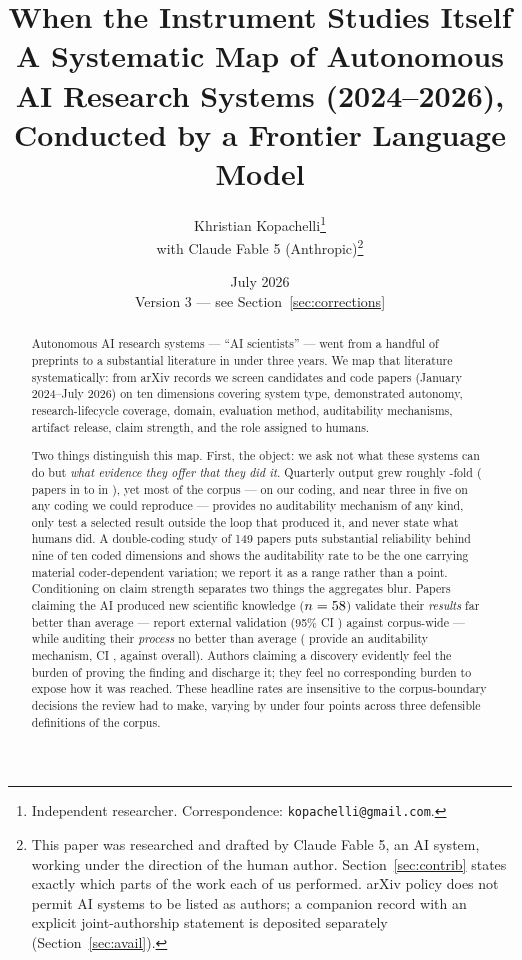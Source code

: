 \documentclass[11pt]{article}
\title{\textbf{When the Instrument Studies Itself}\\[0.3em]
\large A Systematic Map of Autonomous AI Research Systems (2024--2026),\\
Conducted by a Frontier Language Model}
\author{Khristian Kopachelli\thanks{Independent researcher. Correspondence:
\texttt{kopachelli@gmail.com}.}
\\[0.4em]
\normalsize with Claude Fable 5 (Anthropic)\thanks{This paper was researched and drafted by
Claude Fable 5, an AI system, working under the direction of the human author. Section~\ref{sec:contrib}
states exactly which parts of the work each of us performed. arXiv policy does not permit AI
systems to be listed as authors; a companion record with an explicit joint-authorship
statement is deposited separately (Section~\ref{sec:avail}).}}
\date{July 2026\\[0.2em]{\small Version 3 --- see Section~\ref{sec:corrections}}}
\begin{document}
\maketitle

\begin{abstract}
\noindent
Autonomous AI research systems --- ``AI scientists'' --- went from a handful of preprints to
a substantial literature in under three years. We map that literature systematically: from
\nHarvest{} arXiv records we screen \nScreened{} candidates and code \nCorpus{} papers
(January 2024--July 2026) on ten dimensions covering system type, demonstrated autonomy,
research-lifecycle coverage, domain, evaluation method, auditability mechanisms, artifact
release, claim strength, and the role assigned to humans.

Two things distinguish this map. First, the object: we ask not what these systems can do but
\emph{what evidence they offer that they did it}. Quarterly output grew roughly
\growthFactor{}-fold (\firstQn{} papers in \firstQ{} to \peakQn{} in \peakQ{}), yet most of
the corpus --- \pctAuditNone{} on our coding, and near three in five on any coding we could
reproduce --- provides no auditability mechanism of any kind, only \pctHeldOut{} test a
selected result outside the loop that produced it, and \pctHumanUnspec{} never state what
humans did. A double-coding study of 149 papers puts substantial reliability behind nine of
ten coded dimensions and shows the auditability rate to be the one carrying material
coder-dependent variation; we report it as a range rather than a point. Conditioning on claim strength separates two
things the aggregates blur. Papers claiming the AI produced new scientific knowledge
($n=58{}$) validate their \emph{results} far better than average ---
\pctDiscRealWorld{} report external validation (95\% CI \ciDiscRealWorld{}) against
\pctRealWorld{} corpus-wide --- while auditing their \emph{process} no better than average
(\pctDiscAudit{} provide an auditability mechanism, CI \ciDiscAudit{}, against
\pctAnyAudit{} overall). Authors claiming a discovery evidently feel the burden of proving
the finding and discharge it; they feel no corresponding burden to expose how it was reached.
These headline rates are insensitive to the corpus-boundary decisions the review had to
make, varying by under four points across three defensible definitions of the corpus.


\end{abstract}
\end{document}
